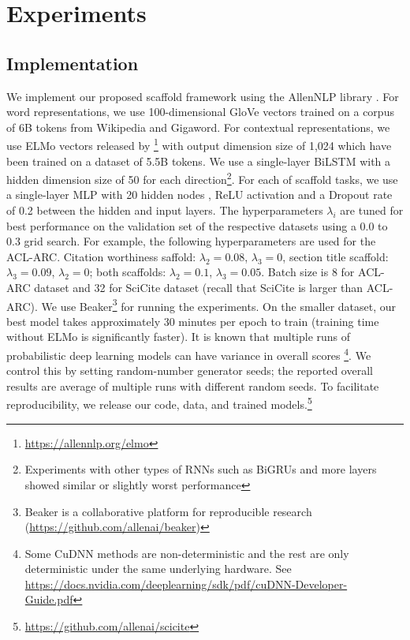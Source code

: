 \documentclass[11pt,a4paper]{article}
\newcommand{\acldata}{ACL-ARC\xspace}
\newcommand{\ourdata}{SciCite\xspace}
\begin{document}
\section{Experiments}
\label{sec:experiments}


\subsection{Implementation}

We implement our proposed scaffold framework using the AllenNLP library \cite{Gardner2017AllenNLP}. For word representations, we use 100-dimensional GloVe vectors \cite{pennington2014glove} trained on a corpus of 6B tokens from Wikipedia and Gigaword. For contextual representations, we use ELMo vectors released by \citet{Peters2018DeepCW}\footnote{\url{https://allennlp.org/elmo}} with output dimension size of 1,024 which have been trained on a dataset of 5.5B tokens. We use a single-layer BiLSTM with a hidden dimension size of 50 for each direction\footnote{Experiments with other types of RNNs such as BiGRUs and more layers showed similar or slightly worst performance}. For each of scaffold tasks, we use a single-layer MLP with 20 hidden nodes , ReLU \cite{nair2010rectified} activation and a Dropout rate \cite{srivastava2014dropout} of 0.2 between the hidden and input layers.
The hyperparameters $\lambda_i$ are tuned for best performance on the validation set of the respective datasets using a 0.0 to 0.3 grid search. For example, the following hyperparameters are used for the ACL-ARC. Citation worthiness saffold: $\lambda_2{=}0.08$, $\lambda_3{=}0$, section title scaffold: $\lambda_3{=}0.09$, $\lambda_2{=}0$; both scaffolds: $\lambda_2{=}0.1$, $\lambda_3{=}0.05$. Batch size is 8 for \acldata dataset and 32 for \ourdata dataset (recall that \ourdata is larger than \acldata). We use Beaker\footnote{Beaker is a collaborative platform for reproducible research (\url{https://github.com/allenai/beaker})} for running the experiments. On the smaller dataset, our best model takes approximately 30 minutes per epoch to train (training time without ELMo is significantly faster).
It is known that multiple runs of probabilistic deep learning models can have variance in overall scores \cite{Reimers2017ReportingSD}\footnote{Some CuDNN methods are non-deterministic and the rest are only deterministic under the same underlying hardware. See \url{https://docs.nvidia.com/deeplearning/sdk/pdf/cuDNN-Developer-Guide.pdf}}. We control this by setting random-number generator seeds; the reported overall results are average of multiple runs with different random seeds.
To facilitate reproducibility, we release our code, data, and trained models.\footnote{\url{https://github.com/allenai/scicite}}
\end{document}
